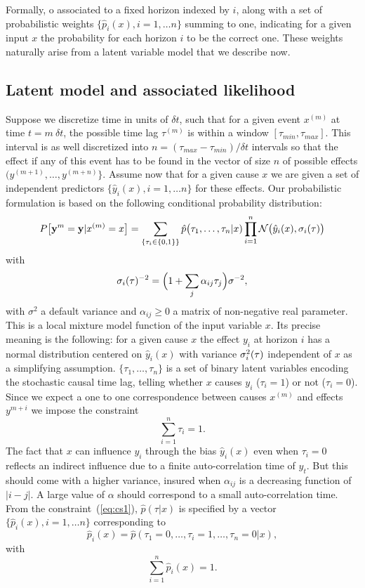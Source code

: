 Formally, o
associated to a fixed horizon indexed by $i$, along with a set
of probabilistic weights $\{\hat p_i(x),i=1,\ldots n\}$ summing to one, indicating for a given input $x$ the probability for each horizon $i$
to be the correct one. These weights naturally arise from a latent variable model that we describe now.

\subsection{Latent model and associated likelihood}\label{sec:latent}

Suppose we discretize time in units of $\delta t$, such that for a given event $x^{(m)}$ at time  
$t = m\ \delta t$, the possible time lag $\tau^{(m)}$ is within a window $[\tau_{min},\tau_{max}]$. 
This interval is as well discretized into $n = (\tau_{max}-\tau_{min})/\delta t $ intervals so that 
the effect if any of this event has to be found in the vector of size $n$ of possible effects $(y^{(m+1)},\ldots,y^{(m+n)}\}$.
Assume now that for a given cause $x$ we are given a set of independent predictors $\{\hat y_i(x),i=1,\ldots n\}$ for these effects.
Our probabilistic formulation is based on the following conditional probability distribution:
\begin{equation}\label{eq:py}
  P\bigl[{\bf y}^{m} = {\bf y}\vert x^{(m)}=x\bigr] = \sum_{\{\tau_i\in\{0,1\}\}}  \hat p\bigl(\tau_1,\ldots,\tau_n\vert x)
\prod_{i=1}^n {\cal N}\bigl(\hat y_i(x),\sigma_i(\tau)\bigr)
\end{equation}
with 
\[
\sigma_i({\bf \tau})^{-2} = \Bigl(1+\sum_j\alpha_{ij} \tau_j\Bigr)\sigma^{-2},
\]
with $\sigma^2$ a default variance and $\alpha_{ij}\ge 0$ a matrix of non-negative real parameter. 
This is a local mixture model function of the input variable $x$. Its precise meaning is the following: for a given cause $x$ the effect
$y_i$ at horizon $i$ has a normal distribution centered on $\hat y_i(x)$ with  variance $\sigma_i^2({\bf \tau})$ independent of $x$ as a simplifying assumption. $\{\tau_1,\ldots,\tau_n\}$ is a set of binary
latent variables encoding the stochastic causal time lag, telling whether $x$ causes $y_i$ ($\tau_i=1$) or not ($\tau_i=0$). Since we expect a one to one correspondence between causes
$x^{(m)}$ and effects $y^{m+i}$ we impose the constraint
\begin{equation}\label{eq:cs1}
\sum_{i=1}^n \tau_i = 1.
\end{equation}
The fact that $x$ can influence $y_i$ through the bias $\hat y_i(x)$ even when $\tau_i=0$ reflects an indirect
influence due to a finite auto-correlation time of $y_t$. But this should come with a higher variance, insured when $\alpha_{ij}$ is a decreasing function of $\vert i-j\vert$.
A large value of $\alpha$ should correspond to a small auto-correlation time. From the constraint~(\ref{eq:cs1}), $\hat p(\tau\vert x)$ is specified by  a vector
$\{\hat p_i(x),i=1,\dots n\}$ corresponding to
\[
\hat p_i(x) = \hat p(\tau_1=0,\ldots,\tau_i=1,\ldots,\tau_n=0\vert x),
\]
with 
\[
\sum_{i=1}^n \hat p_i(x) = 1.
\]

